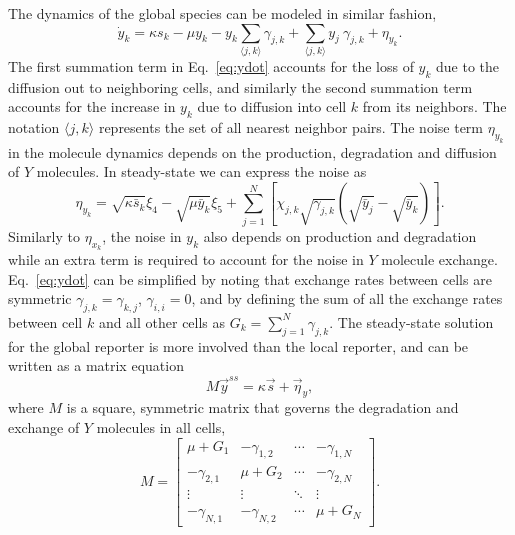 The dynamics of the global species can be modeled in similar fashion,
\begin{equation} \label{eq:ydot}
    \dot{y}_k = \kappa s_k - \mu y_k - y_k \sum_{\langle j,k \rangle} \gamma_{j,k} + \sum_{\langle j,k \rangle} y_j \ \gamma_{j,k} + \eta_{y_k} .
\end{equation}
The first summation term in Eq.\ \ref{eq:ydot} accounts for the loss of $y_k$ due to the diffusion out to neighboring cells, and similarly the second summation term accounts for the increase in $y_k$ due to diffusion into cell $k$ from its neighbors. The notation $\langle j,k \rangle$ represents the set of all nearest neighbor pairs. The noise term $\eta_{y_k}$ in the molecule dynamics depends on the production, degradation and diffusion of $Y$ molecules. In steady-state we can express the noise as
\begin{equation*}
    \eta_{y_k} = \sqrt{\kappa \bar{s}_k} \xi_4 - \sqrt{\mu\bar{y}_k} \xi_5 + \sum_{j=1}^N \left[ \chi_{j,k} \sqrt{\gamma_{j,k}} \left( \sqrt{\bar{y}_j}-\sqrt{\bar{y}_k} \right) \right] .
\end{equation*}
Similarly to $\eta_{x_k}$, the noise in $y_k$ also depends on production and degradation while an extra term is required to account for the noise in $Y$ molecule exchange. Eq.\ \ref{eq:ydot} can be simplified by noting that exchange rates between cells are symmetric $\gamma_{j,k}=\gamma_{k,j}$, $\gamma_{i,i}=0$, and by defining the sum of all the exchange rates between cell $k$ and all other cells as $G_k = \sum_{j=1}^N \gamma_{j,k}$. The steady-state solution for the global reporter is more involved than the local reporter, and can be written as a matrix equation
\begin{equation} \label{eq:yss}
    M\vec{y}^{ss} = \kappa\vec{s} + \vec{\eta}_y,
\end{equation}
where $M$ is a square, symmetric matrix that governs the degradation and exchange of $Y$ molecules in all cells,
\begin{equation} \label{eq:Mmatrix}
    M =
    \begin{bmatrix}
     \mu+G_1 & -\gamma_{1,2} & \cdots & -\gamma_{1,N} \\
     -\gamma_{2,1} & \mu+G_2 & \cdots & -\gamma_{2,N} \\
     \vdots  & \vdots  & \ddots & \vdots  \\
     -\gamma_{N,1} & -\gamma_{N,2} & \cdots & \mu+G_N
    \end{bmatrix}.
\end{equation}


